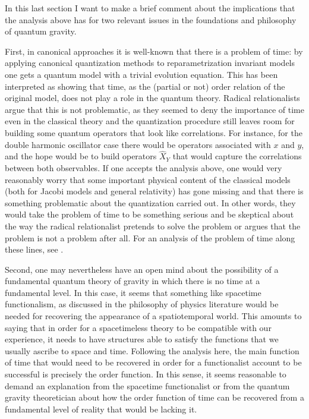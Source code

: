 \documentclass[12 pt]{article}
\begin{document}
In this last section I want to make a brief comment about the implications that the analysis above has for two relevant issues in the foundations and philosophy of quantum gravity.

First, in canonical approaches it is well-known that there is a problem of time: by applying canonical quantization methods to reparametrization invariant models one gets a quantum model with a trivial evolution equation. This has been interpreted as showing that time, as the (partial or not) order relation of the original model, does not play a role in the quantum theory. Radical relationalists argue that this is not problematic, as they seemed to deny the importance of time even in the classical theory and the quantization procedure still leaves room for building some quantum operators that look like correlations. For instance, for the double harmonic oscillator case there would be operators associated with $x$ and $y$, and the hope would be to build operators $\hat{X}_Y$ that would capture the correlations between both observables. If one accepts the analysis above, one would very reasonably worry that some important physical content of the classical models (both for Jacobi models and general relativity) has gone missing and that there is something problematic about the quantization carried out. In other words, they would take the problem of time to be something serious and be skeptical about the way the radical relationalist pretends to solve the problem or argues that the problem is not a problem after all. For an analysis of the problem of time along these lines, see \citep{MozotaFrauca2023}.

Second, one may nevertheless have an open mind about the possibility of a fundamental quantum theory of gravity in which there is no time at a fundamental level. In this case, it seems that something like spacetime functionalism, as discussed in the philosophy of physics literature \citep{Lam2018-LAMSIA-2,Lam2020} would be needed for recovering the appearance of a spatiotemporal world. This amounts to saying that in order for a spacetimeless theory to be compatible with our experience, it needs to have structures able to satisfy the functions that we usually ascribe to space and time. Following the analysis here, the main function of time that would need to be recovered in order for a functionalist account to be successful is precisely the order function. In this sense, it seems reasonable to demand an explanation from the spacetime functionalist or from the quantum gravity theoretician about how the order function of time can be recovered from a fundamental level of reality that would be lacking it. 
\end{document}
